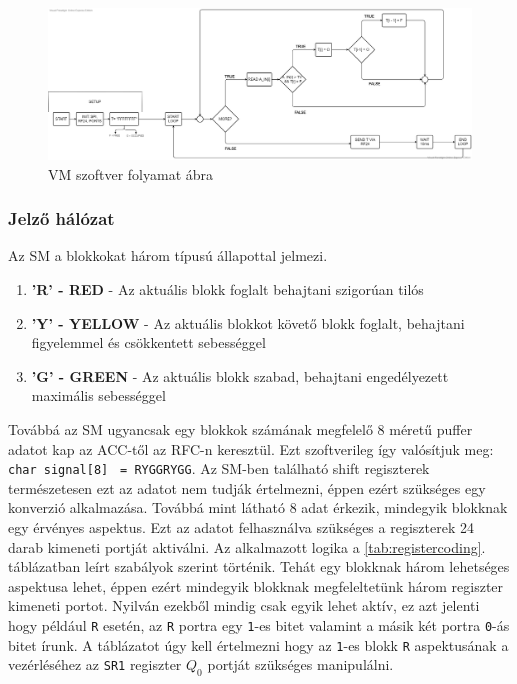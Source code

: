 \documentclass[a4paper,12pt]{article}
\begin{document}
\begin{figure}[!htp]
	\includegraphics[width=\linewidth]{images/VM_module_flow_chart.png}
    \caption[VM folyamat ábra]{VM szoftver folyamat ábra}
	\label{fig:VMflowchart}
\end{figure}

\subsubsection{Jelző hálózat}
Az SM a blokkokat három típusú állapottal jelmezi.
\begin{enumerate}
	\item \textbf{'R' - RED} - Az aktuális blokk foglalt behajtani szigorúan tilós
	\item \textbf{'Y' - YELLOW} - Az aktuális blokkot követő blokk foglalt, behajtani figyelemmel és csökkentett sebességgel
	\item \textbf{'G' - GREEN} - Az aktuális blokk szabad, behajtani engedélyezett maximális sebességgel
\end{enumerate}
Továbbá az SM ugyancsak egy blokkok számának megfelelő 8 méretű puffer adatot kap az ACC-től az RFC-n keresztül.
Ezt szoftverileg így valósítjuk meg: \texttt{char signal[8]} \texttt{ = RYGGRYGG}. 
Az SM-ben található shift regiszterek természetesen ezt az adatot nem tudják értelmezni, éppen ezért szükséges egy konverzió alkalmazása.
Továbbá mint látható 8 adat érkezik, mindegyik blokknak egy érvényes aspektus. 
Ezt az adatot felhasználva szükséges a regiszterek 24 darab kimeneti portját aktiválni.
Az alkalmazott logika a \ref{tab:registercoding}. táblázatban leírt szabályok szerint történik.
Tehát egy blokknak három lehetséges aspektusa lehet, éppen ezért mindegyik blokknak megfeleltetünk három regiszter kimeneti portot.
Nyilván ezekből mindig csak egyik lehet aktív, ez azt jelenti hogy például  \texttt{R} esetén, az \texttt{R} portra egy \texttt{1}-es bitet valamint a másik két portra \texttt{0}-ás bitet írunk.
A táblázatot úgy kell értelmezni hogy az \texttt{1}-es blokk \texttt{R} aspektusának a vezérléséhez az \texttt{SR1} regiszter $Q_{0}$ portját szükséges manipulálni.
\end{document}

